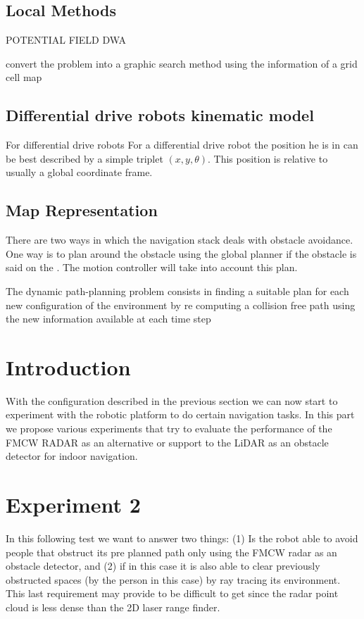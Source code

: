 \subsection{Local Methods}
POTENTIAL FIELD
DWA



convert the problem into a graphic search method using the information of a grid cell map
 

\subsection{Differential drive robots kinematic model}
For differential drive robots 
For a differential drive robot the position he is in can be best described by a simple triplet $(x,y,\theta)$. This position is relative to usually a  global coordinate frame. 
\subsection{Map Representation}



There are two ways in which the navigation stack deals with obstacle avoidance. One way is to plan around the obstacle using the global planner if the obstacle is said on the .
The motion controller will take into account this plan. 










The dynamic path-planning problem consists in finding a suitable plan for each new configuration of the environment by re computing a collision free path using the new information available at each time step

\section{Introduction}
With the configuration described in the previous section we can now start to experiment with the robotic platform to do certain navigation tasks. In this part we propose various experiments that try to evaluate the  performance of the \ac{FMCW} \ac{RADAR} as an alternative or support to the \ac{LiDAR} as an obstacle detector for indoor navigation.
\section {Experiment 2}
In this following test we want to answer two things: (1) Is the robot able to avoid people that obstruct its pre planned path only using the  \ac{FMCW} radar as an obstacle detector, and (2) if in this case it is also able to clear previously obstructed spaces (by the person in this case) by ray tracing its environment. This last requirement may provide to be difficult to get since the radar point cloud is less dense than the 2D laser range finder.
